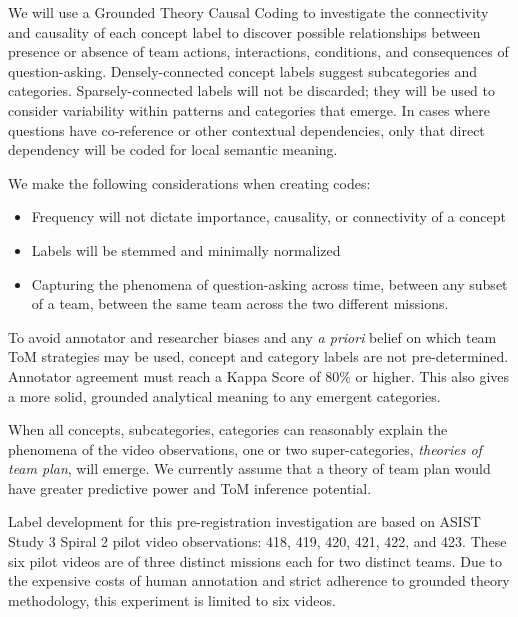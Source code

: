 We will use a Grounded Theory Causal Coding to investigate the connectivity and causality of each concept label to discover possible relationships between presence or absence of team actions, interactions, conditions, and consequences of question-asking. Densely-connected concept labels suggest subcategories and categories. Sparsely-connected labels will not be discarded; they will be used to consider variability within patterns and categories that emerge. In cases where questions have co-reference or other contextual dependencies, only that direct dependency will be coded for local semantic meaning.

\vspace{15pt}

We make the following considerations when creating codes: 

\begin{itemize}
    \item Frequency will not dictate importance, causality, or connectivity of a concept
    \item Labels will be stemmed and minimally normalized 
    \item Capturing the phenomena of question-asking across time, between any subset of a team, between the same team across the two different missions. 
\end{itemize}

\vspace{15pt}

To avoid annotator and researcher biases and any \textit{a priori} belief on
which team ToM strategies may be used, concept and category labels are not
pre-determined. Annotator agreement must reach a Kappa Score of 80\% or higher. This also gives a more solid, grounded analytical meaning to any emergent categories. 

When all concepts, subcategories, categories can reasonably explain the phenomena of the video observations, one or two super-categories, \textit{theories of team plan}, will emerge. We currently assume that a theory of team plan would have greater predictive power and ToM inference potential. 

Label development for this pre-registration investigation are based on ASIST
Study 3 Spiral 2 pilot video observations: 418, 419, 420, 421, 422, and 423.
These six pilot videos are of three distinct missions each for two distinct
teams. Due to the expensive costs of human annotation and strict adherence to grounded theory methodology, this experiment is limited to six videos. 

